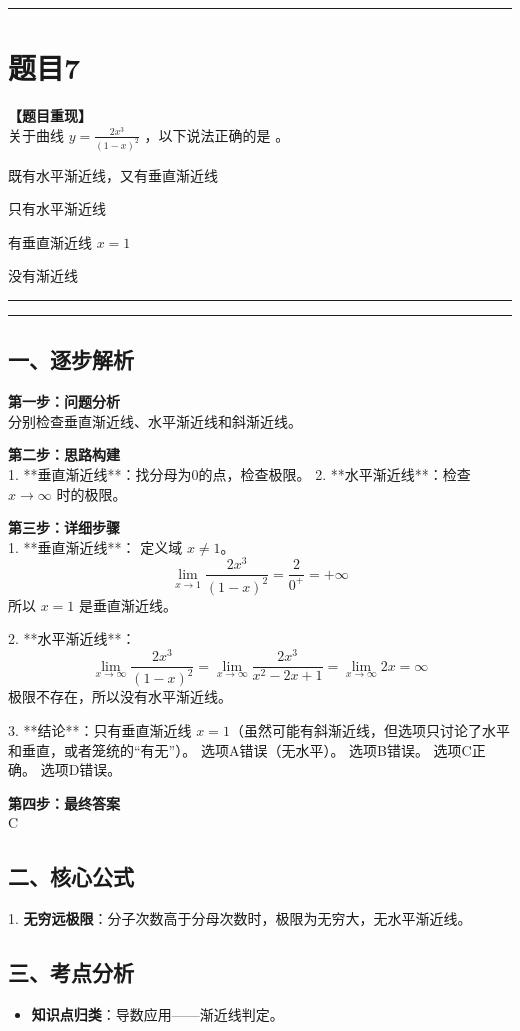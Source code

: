 \documentclass[12pt, a4paper]{ctexart}
\newcommand{\TopSeparator}{
    \par\noindent\rule{\textwidth}{1.5pt}\vspace{0.5em} %
}
\newcommand{\AnalysisSeparator}{
    \par\noindent\rule{\textwidth}{0.5pt}\vspace{0.2em}\hrule\vspace{0.5em} %
}
\newenvironment{RedAnalysis}{
    \par
    \color{red} %
}{
    \par
    \color{black} %
}
\newcommand{\choicesTwo}[4]{
    \begin{enumerate}[label=\Alph*., itemsep=0pt, parsep=0pt, topsep=5pt, labelsep=0.5em]
        \begin{minipage}{0.45\linewidth} \item #1 \end{minipage}
        \begin{minipage}{0.45\linewidth} \item #2 \end{minipage}
        \begin{minipage}{0.45\linewidth} \item #3 \end{minipage}
        \begin{minipage}{0.45\linewidth} \item #4 \end{minipage}
    \end{enumerate}
}
\begin{document}
\TopSeparator
\section*{题目7}

\textbf{【题目重现】} \\
关于曲线 $ y=\frac{2x^{3}}{(1-x)^{2}} $ ，以下说法正确的是 \underline{\hspace{1cm}}。
\choicesTwo
{既有水平渐近线，又有垂直渐近线}
{只有水平渐近线}
{有垂直渐近线 $ x = 1 $}
{没有渐近线}

\AnalysisSeparator

\begin{RedAnalysis}

\subsection*{一、逐步解析}

\textbf{第一步：问题分析} \\
分别检查垂直渐近线、水平渐近线和斜渐近线。

\textbf{第二步：思路构建} \\
1. **垂直渐近线**：找分母为0的点，检查极限。
2. **水平渐近线**：检查 $x \to \infty$ 时的极限。

\textbf{第三步：详细步骤} \\
1. **垂直渐近线**：
   定义域 $x \neq 1$。
   \[ \lim_{x \to 1} \frac{2x^3}{(1-x)^2} = \frac{2}{0^+} = +\infty \]
   所以 $x = 1$ 是垂直渐近线。

2. **水平渐近线**：
   \[ \lim_{x \to \infty} \frac{2x^3}{(1-x)^2} = \lim_{x \to \infty} \frac{2x^3}{x^2 - 2x + 1} = \lim_{x \to \infty} 2x = \infty \]
   极限不存在，所以没有水平渐近线。

3. **结论**：只有垂直渐近线 $x=1$（虽然可能有斜渐近线，但选项只讨论了水平和垂直，或者笼统的“有无”）。
   选项A错误（无水平）。
   选项B错误。
   选项C正确。
   选项D错误。

\textbf{第四步：最终答案} \\
C

\subsection*{二、核心公式}
1. \textbf{无穷远极限}：分子次数高于分母次数时，极限为无穷大，无水平渐近线。

\subsection*{三、考点分析}
\begin{itemize}
    \item \textbf{知识点归类}：导数应用——渐近线判定。
\end{itemize}

\end{RedAnalysis}
\end{document}
